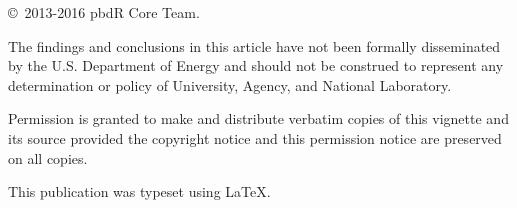 \null
\vfill
\copyright\ 2013-2016 pbdR Core Team.

The findings and conclusions in this article have not been
formally disseminated by the U.S. Department of Energy
and should not be construed to represent any determination or
policy of University, Agency, and National Laboratory.

Permission is granted to make and distribute verbatim copies of
this vignette and its source provided the copyright notice and
this permission notice are preserved on all copies.

This publication was typeset using \LaTeX.
